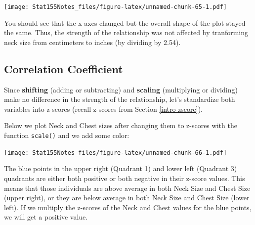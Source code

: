 \documentclass[]{book}
\newenvironment{Shaded}{\begin{snugshade}}{\end{snugshade}}
\newcommand{\DataTypeTok}[1]{\textcolor[rgb]{0.13,0.29,0.53}{#1}}
\newcommand{\FloatTok}[1]{\textcolor[rgb]{0.00,0.00,0.81}{#1}}
\newcommand{\KeywordTok}[1]{\textcolor[rgb]{0.13,0.29,0.53}{\textbf{#1}}}
\newcommand{\NormalTok}[1]{#1}
\newcommand{\OperatorTok}[1]{\textcolor[rgb]{0.81,0.36,0.00}{\textbf{#1}}}
\newcommand{\StringTok}[1]{\textcolor[rgb]{0.31,0.60,0.02}{#1}}
\begin{document}
\begin{Shaded}
\end{Shaded}

\texttt{[image: Stat155Notes\_files/figure-latex/unnamed-chunk-65-1.pdf]}

You should see that the x-axes changed but the overall shape of the plot stayed the same. Thus, the strength of the relationship was not affected by tranforming neck size from centimeters to inches (by dividing by 2.54).

\hypertarget{correlation-coefficient}{%
\subsection{Correlation Coefficient}\label{correlation-coefficient}}

Since \textbf{shifting} (adding or subtracting) and \textbf{scaling} (multiplying or dividing) make no difference in the strength of the relationship, let's standardize both variables into z-scores (recall z-scores from Section \ref{intro-zscore}).

Below we plot Neck and Chest sizes after changing them to z-scores with the function \texttt{scale()} and we add some color:

\texttt{[image: Stat155Notes\_files/figure-latex/unnamed-chunk-66-1.pdf]}

The blue points in the upper right (Quadrant 1) and lower left (Quadrant 3) quadrants are either both positive or both negative in their z-score values. This means that those individuals are above average in both Neck Size and Chest Size (upper right), or they are below average in both Neck Size and Chest Size (lower left). If we multiply the z-scores of the Neck and Chest values for the blue points, we will get a positive value.
\end{document}
